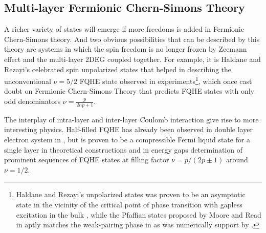 \documentclass[bachelor,english,numbers]{ustcthesis}
\begin{document}
	\subsection{Multi-layer Fermionic Chern-Simons Theory}
		\indent\par A richer variety of states will emerge if more freedoms is added in Fermionic Chern-Simons theory. And two obvious possibilities that can be described by this theory are systems in which the spin freedom is no longer frozen by Zeemann effect and the multi-layer 2DEG coupled together. For example, it is Haldane and Rezayi's celebrated spin unpolarized states \cite{haldane1988spin} that helped in describing the unconventional $\nu=5/2$ FQHE state observed in experiments\footnote{Haldane and Rezayi's unpolarized states was proven to be an asymptotic state in the vicinity of the critical point of phase transition with gapless excitation in the bulk \cite{read2000paired}, while the Pfaffian states proposed by Moore and Read in \cite{moore1991nonabelions} aptly matches the weak-pairing phase in \cite{read2000paired} as was numerically support by \cite{morf1998transition}.}, which once cast doubt on Fermionic Chern-Simons Theory that predicts FQHE states with only odd denominators $\nu=\frac{p}{2np+1}$.\par
		The interplay of intra-layer and inter-layer Coulomb interaction give rise to more interesting physics. Half-filled FQHE has already been observed in double layer electron system in \cite{suen1992observation}, but is proven to be a compressible Fermi liquid state for a single layer in theoretical constructions \cite{stern1995singularities} and in energy gaps determination of prominent sequences of FQHE states \cite{du1993experimental} at filling factor $\nu=p/(2p\pm1)$ around $\nu=1/2$.
\end{document}
